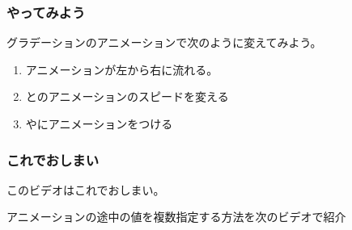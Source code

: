 \begin{frame}[containsverbatim]
 \frametitle{やってみよう}
 グラデーションのアニメーションで次のように変えてみよう。
\begin{enumerate}
 \item アニメーションが左から右に流れる。
 \item {}とのアニメーションのスピードを変える
 \item {}やにアニメーションをつける
\end{enumerate}
\end{frame}
\begin{frame}[containsverbatim]
 \frametitle{これでおしまい}
 このビデオはこれでおしまい。

 アニメーションの途中の値を複数指定する方法を次のビデオで紹介
\end{frame}

\begin{frame}[containsverbatim]
\frametitle{}
\end{frame}

